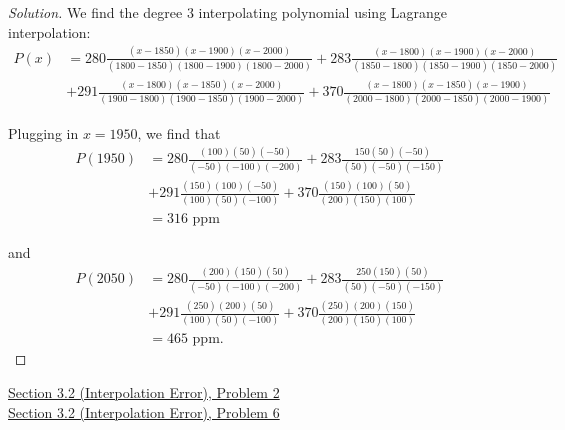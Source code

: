 \documentclass[11pt]{article}
\newenvironment{solution}
  {\renewcommand\qedsymbol{$\blacksquare$}\begin{proof}[Solution]}
  {\end{proof}}
\theoremstyle{definition}
\begin{document}
\begin{solution}
We find the degree $3$ interpolating polynomial using Lagrange interpolation:
\begin{align*} P(x) &= 280 \frac{(x-1850)(x-1900)(x-2000)}{(1800-1850)(1800-1900)(1800-2000)} + 283 \frac{(x-1800)(x-1900)(x-2000)}{(1850-1800)(1850-1900)(1850-2000)} \\
&+ 291 \frac{(x-1800)(x-1850)(x-2000)}{(1900-1800)(1900-1850)(1900-2000)} + 370 \frac{(x-1800)(x-1850)(x-1900)}{(2000-1800)(2000-1850)(2000-1900)}\end{align*}

Plugging in $x=1950$, we find that \begin{align*}
    P(1950) &= 280\frac{(100)(50)(-50)}{(-50) (-100) (-200)} + 283 \frac{150(50)(-50)}{(50)(-50)(-150)} \\
    &+ 291\frac{(150)(100)(-50)}{(100)(50)(-100)} + 370\frac{(150)(100)(50)}{(200)(150)(100)} \\
    &= \boxed{316 \text{ ppm}}
\end{align*}

and \begin{align*}
    P(2050) &= 280\frac{(200)(150)(50)}{(-50) (-100) (-200)} + 283 \frac{250(150)(50)}{(50)(-50)(-150)} \\
    &+ 291\frac{(250)(200)(50)}{(100)(50)(-100)} + 370\frac{(250)(200)(150)}{(200)(150)(100)} \\
    &= \boxed{465 \text{ ppm}}.
\end{align*}
\end{solution}

\newpage

\underline{Section 3.2 (Interpolation Error), Problem 2} \\

\underline{Section 3.2 (Interpolation Error), Problem 6} \\
\end{document}

